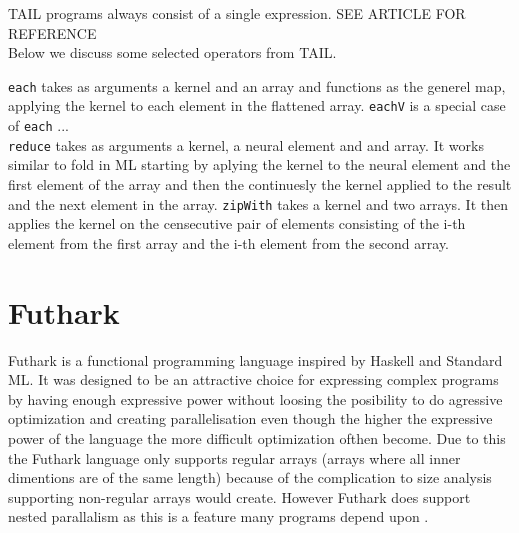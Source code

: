 \documentclass[11pt]{article}
\begin{document}
TAIL programs always consist of a single expression. SEE ARTICLE FOR REFERENCE \\

Below we discuss some selected operators from TAIL.

{\tt each} takes as arguments a kernel and an array and functions as the generel map, applying the kernel to each element in the flattened array. 
{\tt eachV} is a special case of {\tt each} ...\\
{\tt reduce} takes as arguments a kernel, a neural element and and array. It works similar to fold in ML starting by aplying the kernel to the neural element and the first element of the array and then the continuesly the kernel applied to the result and the next element in the array. 
{\tt zipWith} takes a kernel and two arrays. It then applies the kernel on the censecutive pair of elements consisting of the i-th element from the first array and the i-th element from the second array. 




 


\newpage
\section{Futhark}

Futhark is a functional programming language inspired by Haskell and Standard ML. It was designed to be an attractive choice for expressing complex programs by having enough expressive power without loosing the posibility to do agressive optimization and creating parallelisation even though the higher the expressive power of the language the more difficult optimization ofthen become. Due to this the Futhark language only supports regular arrays (arrays where all inner dimentions are of the same length) because of the complication to size analysis supporting non-regular arrays would create.
However Futhark does support nested parallalism as this is a feature many programs depend upon \cite{Henriksen}.\\
\end{document}
